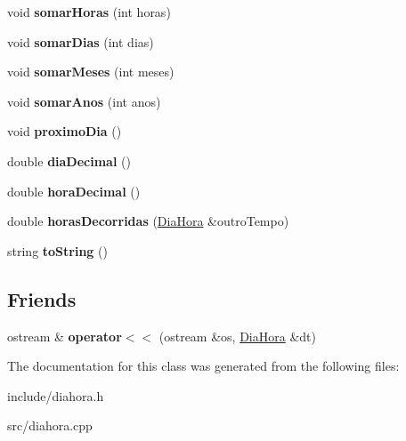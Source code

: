 \begin{DoxyCompactItemize}
\item 
\mbox{\label{classDiaHora_a970c76f04a04927cae98b35c71e95d4d}} 
void {\bfseries somar\+Horas} (int horas)
\item 
\mbox{\label{classDiaHora_a163dfe90f0c908040ff80cf7ecbda3bb}} 
void {\bfseries somar\+Dias} (int dias)
\item 
\mbox{\label{classDiaHora_aa7dfe2a60c6ed68be03acc8ed94d4abd}} 
void {\bfseries somar\+Meses} (int meses)
\item 
\mbox{\label{classDiaHora_ac97ab2f26ea6998cf7189bf030dde333}} 
void {\bfseries somar\+Anos} (int anos)
\item 
\mbox{\label{classDiaHora_ac1299ac04b8ff6e528999c57e1e612bc}} 
void {\bfseries proximo\+Dia} ()
\item 
\mbox{\label{classDiaHora_a308ef7685e4ba7865aeec6776f15875a}} 
double {\bfseries dia\+Decimal} ()
\item 
\mbox{\label{classDiaHora_a2da6b5cc489d269f03540ca4f7b08672}} 
double {\bfseries hora\+Decimal} ()
\item 
\mbox{\label{classDiaHora_ad1f9b566b0a63e9c84feb2c5893e953b}} 
double {\bfseries horas\+Decorridas} (\hyperlink{classDiaHora}{Dia\+Hora} \&outro\+Tempo)
\item 
\mbox{\label{classDiaHora_a3371158e2dffb4b42e90ef62b2567293}} 
string {\bfseries to\+String} ()
\end{DoxyCompactItemize}
\subsection*{Friends}
\begin{DoxyCompactItemize}
\item 
\mbox{\label{classDiaHora_af175ad9b86d1309ea389548d80c9782a}} 
ostream \& {\bfseries operator$<$$<$} (ostream \&os, \hyperlink{classDiaHora}{Dia\+Hora} \&dt)
\end{DoxyCompactItemize}


The documentation for this class was generated from the following files\+:\begin{DoxyCompactItemize}
\item 
include/diahora.\+h\item 
src/diahora.\+cpp\end{DoxyCompactItemize}
